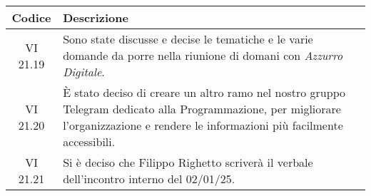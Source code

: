 \clearpage
\vspace*{-2cm} 
\begin{table}[t]
    \centering
    \begin{tabular}{|c|p{}|}
        \hline
        \rowcolor[gray]{0.75}
        \textbf{Codice} & \textbf{Descrizione}\\
        \hline    
        VI 21.19 & Sono state discusse e decise le tematiche e le varie domande da porre nella riunione di domani con \emph{Azzurro Digitale}.\\
        \hline 
        VI 21.20 & È stato deciso di creare un altro ramo nel nostro gruppo Telegram dedicato alla Programmazione, per migliorare l'organizzazione e rendere le informazioni più facilmente accessibili.\\
        \hline 
        VI 21.21 & Si è deciso che Filippo Righetto scriverà il verbale dell'incontro interno del 02/01/25. \\
        \hline
    \end{tabular}
\end{table}

\clearpage
